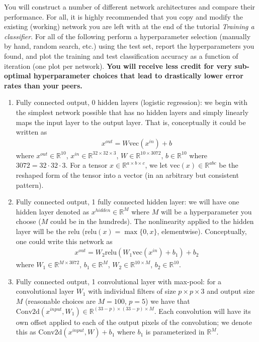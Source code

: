 \documentclass{article}
\newcommand{\field}[1]{\mathbb{#1}}
\newcommand{\1}{\mathbf{1}}
\newcommand{\R}{\field{R}} %
\def\vec{\text{vec}}
\begin{document}
You will construct a number of different network architectures and compare their performance.
For all, it is highly recommended that you copy and modify the existing (working) network you are left with at the end of the tutorial \emph{Training a classifier}.
For all of the following perform a hyperparameter selection (manually by hand, random search, etc.) using the test set, report the hyperparameters you found, and plot the training and test classification accuracy as a function of iteration (one plot per network).
\textbf{You will receive less credit for very sub-optimal hyperparameter choices that lead to drastically lower error rates than your peers.}
\begin{enumerate}
  \item Fully connected output, 0 hidden layers (logistic regression): we begin with the simplest network possible that has no hidden layers and simply linearly maps the input layer to the output layer. That is, conceptually it could be written as 
  \begin{align*}
  x^{out} = W \vec(x^{in}) +b
  \end{align*} 
  where $x^{out} \in \R^{10}$, $x^{in} \in \R^{32 \times 32 \times 3}$, $W \in \R^{10 \times 3072}$, $b \in \R^{10}$ where $3072 = 32 \cdot 32 \cdot 3$. For a tensor $x \in \R^{a \times b \times c}$, we let $\vec(x) \in \R^{a b c}$ be the reshaped form of the tensor into a vector (in an arbitrary but consistent pattern). 
  \item Fully connected output, 1 fully connected hidden layer: we will have one hidden layer denoted as $x^{hidden} \in \R^{M}$ where $M$ will be a hyperparameter you choose ($M$ could be in the hundreds). The nonlinearity applied to the hidden layer will be the relu ($\mathrm{relu}(x) = \max\{0,x\}$, elementwise). Conceptually, one could write this network as 
  \begin{align*}
  x^{out} = W_2 \mathrm{relu}(W_1 \vec(x^{in}) +b_1) + b_2
  \end{align*}
  where $W_1 \in \R^{M \times 3072}$, $b_1 \in \R^M$, $W_2 \in \R^{10 \times M}$, $b_2 \in \R^{10}$.
  \item Fully connected output, 1 convolutional layer with max-pool: for a convolutional layer $W_1$ with individual filters of size $p \times p \times 3$ and output size $M$ (reasonable choices are $M=100$, $p=5$) we have that $\mathrm{Conv2d}(x^{input}, W_1) \in \R^{(33-p) \times (33-p) \times M}$. 
  Each convolution will have its own offset applied to each of the output pixels of the convolution; we denote this as $\mathrm{Conv2d}(x^{input}, W) + b_1$ where $b_1$ is parameterized in $\R^M$.

\end{enumerate}
\end{document}
